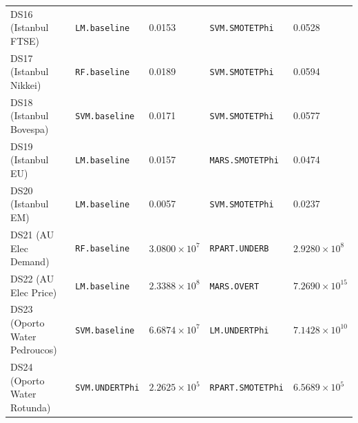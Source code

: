 \begin{table}[t]
{{\begin{tabular}{lllll}
DS16 (Istanbul FTSE) & \texttt{LM.baseline} & 0.0153 & \texttt{SVM.SMOTETPhi} & 0.0528 \\
DS17 (Istanbul Nikkei) & \texttt{RF.baseline} & 0.0189 & \texttt{SVM.SMOTETPhi} & 0.0594 \\
DS18 (Istanbul Bovespa) & \texttt{SVM.baseline} & 0.0171 & \texttt{SVM.SMOTETPhi} & 0.0577 \\
DS19 (Istanbul EU) & \texttt{LM.baseline} & 0.0157 & \texttt{MARS.SMOTETPhi} & 0.0474 \\
DS20 (Istanbul EM) & \texttt{LM.baseline} & 0.0057 & \texttt{SVM.SMOTETPhi} & 0.0237 \\
DS21 (AU Elec Demand) & \texttt{RF.baseline} & $3.0800 \times 10^{7}$ & \texttt{RPART.UNDERB} & $2.9280 \times 10^{8}$ \\
DS22 (AU Elec Price) & \texttt{LM.baseline} & $2.3388 \times 10^{8}$ & \texttt{MARS.OVERT} & $7.2690 \times 10^{15}$ \\
DS23 (Oporto Water Pedroucos) & \texttt{SVM.baseline} & $6.6874 \times 10^{7}$ & \texttt{LM.UNDERTPhi} & $7.1428 \times 10^{10}$ \\
DS24 (Oporto Water Rotunda) & \texttt{SVM.UNDERTPhi} & $2.2625 \times 10^{5}$ & \texttt{RPART.SMOTETPhi} & $6.5689 \times 10^{5}$ \\
\bottomrule
\end{tabular}%
}%
}
\end{table}
